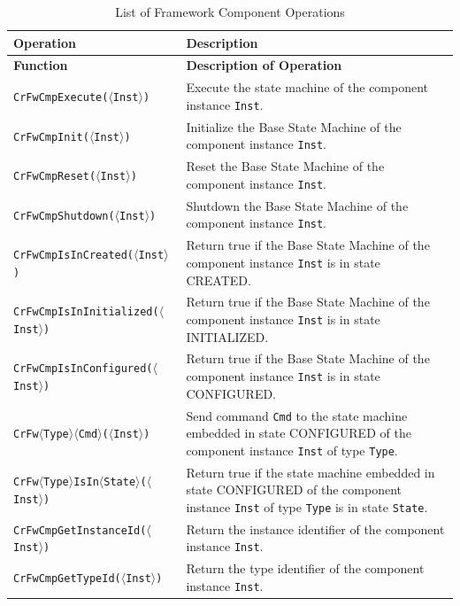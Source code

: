 \documentclass[a4paper,10pt]{article}
\begin{document}
\begin{longtable}{|p{5.0cm}|p{6.2cm}|}
\caption{List of Framework Component Operations} \label{tab:CmpOperations}\\
\hline
\rowcolor{light-gray}
\textbf{Operation} & \textbf{Description} \\
\hline\hline
\endfirsthead
\rowcolor{light-gray}
\textbf{Function} & \textbf{Description of Operation} \\
\hline\hline
\endhead
\texttt{CrFwCmpExecute($\langle$Inst$\rangle$)} & Execute the state machine of the component instance \texttt{Inst}. \\
\hline
\texttt{CrFwCmpInit($\langle$Inst$\rangle$)} & Initialize the Base State Machine of the component instance \texttt{Inst}. \\
\hline
\texttt{CrFwCmpReset($\langle$Inst$\rangle$)} & Reset the Base State Machine of the component instance \texttt{Inst}. \\
\hline
\texttt{CrFwCmpShutdown($\langle$Inst$\rangle$)} & Shutdown the Base State Machine of the component instance \texttt{Inst}. \\
\hline
\texttt{CrFwCmpIsInCreated($\langle$Inst$\rangle$)} & Return true if the Base State Machine of the component instance \texttt{Inst} is in state CREATED. \\
\hline
\texttt{CrFwCmpIsInInitialized($\langle$Inst$\rangle$)} & Return true if the Base State Machine of the component instance \texttt{Inst} is in state INITIALIZED. \\
\hline
\texttt{CrFwCmpIsInConfigured($\langle$Inst$\rangle$)} & Return true if the Base State Machine of the component instance \texttt{Inst} is in state CONFIGURED. \\
\hline
\texttt{CrFw$\langle$Type$\rangle\langle$Cmd$\rangle$($\langle$Inst$\rangle$)} & Send command \texttt{Cmd} to the state machine embedded in state CONFIGURED of the component instance \texttt{Inst} of type \texttt{Type}. \\
\hline
\texttt{CrFw$\langle$Type$\rangle$IsIn$\langle$State$\rangle$($\langle$Inst$\rangle$)} & Return true if the state machine embedded in state CONFIGURED of the component instance \texttt{Inst} of type \texttt{Type} is in state \texttt{State}. \\
\hline
\texttt{CrFwCmpGetInstanceId($\langle$Inst$\rangle$)} & Return the instance identifier of the component instance \texttt{Inst}. \\
\hline
\texttt{CrFwCmpGetTypeId($\langle$Inst$\rangle$)} & Return the type identifier of the component instance \texttt{Inst}. \\
\hline
\end{longtable}
\end{document}
